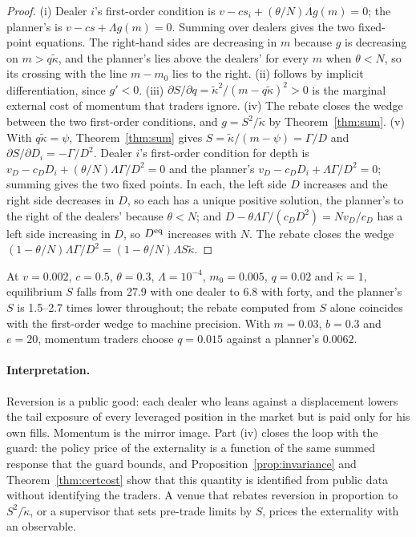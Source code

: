 \begin{proof}
(i) Dealer $i$'s first-order condition is $v-cs_i+(\theta/N)\Lambda g(m)=0$; the planner's is $v-cs+\Lambda g(m)=0$. Summing over dealers gives the two fixed-point equations. The right-hand sides are decreasing in $m$ because $g$ is decreasing on $m>q\tilde\kappa$, and the planner's lies above the dealers' for every $m$ when $\theta<N$, so its crossing with the line $m-m_0$ lies to the right. (ii) follows by implicit differentiation, since $g'<0$. (iii) $\partial S/\partial q=\tilde\kappa^2/(m-q\tilde\kappa)^2>0$ is the marginal external cost of momentum that traders ignore. (iv) The rebate closes the wedge between the two first-order conditions, and $g=S^2/\tilde\kappa$ by Theorem~\ref{thm:sum}. (v) With $q\tilde\kappa=\psi$, Theorem~\ref{thm:sum} gives $S=\tilde\kappa/(m-\psi)=\Gamma/D$ and $\partial S/\partial D_i=-\Gamma/D^2$. Dealer $i$'s first-order condition for depth is $v_D-c_DD_i+(\theta/N)\Lambda\Gamma/D^2=0$ and the planner's $v_D-c_DD_i+\Lambda\Gamma/D^2=0$; summing gives the two fixed points. In each, the left side $D$ increases and the right side decreases in $D$, so each has a unique positive solution, the planner's to the right of the dealers' because $\theta<N$; and $D-\theta\Lambda\Gamma/(c_DD^2)=Nv_D/c_D$ has a left side increasing in $D$, so $D^{\rm eq}$ increases with $N$. The rebate closes the wedge $(1-\theta/N)\Lambda\Gamma/D^2=(1-\theta/N)\Lambda S\tilde\kappa$.
\end{proof}

At $v=0.002$, $c=0.5$, $\theta=0.3$, $\Lambda=10^{-4}$, $m_0=0.005$, $q=0.02$ and $\tilde\kappa=1$, equilibrium $S$ falls from 27.9 with one dealer to 6.8 with forty, and the planner's $S$ is 1.5--2.7 times lower throughout; the rebate computed from $S$ alone coincides with the first-order wedge to machine precision. With $m=0.03$, $b=0.3$ and $e=20$, momentum traders choose $q=0.015$ against a planner's $0.0062$.

\paragraph{Interpretation.} Reversion is a public good: each dealer who leans against a displacement lowers the tail exposure of every leveraged position in the market but is paid only for his own fills. Momentum is the mirror image. Part (iv) closes the loop with the guard: the policy price of the externality is a function of the same summed response that the guard bounds, and Proposition~\ref{prop:invariance} and Theorem~\ref{thm:certcost} show that this quantity is identified from public data without identifying the traders. A venue that rebates reversion in proportion to $S^2/\tilde\kappa$, or a supervisor that sets pre-trade limits by $S$, prices the externality with an observable.

